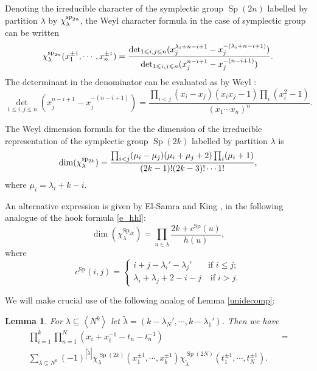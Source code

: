 \documentclass[11pt]{amsart}
\newcommand{\tmop}[1]{\ensuremath{\operatorname{#1}}}
\newtheorem{lemma}{Lemma}
\renewcommand{\sp}{{\rm sp}}
\begin{document}
Denoting the irreducible character of the symplectic group
$\tmop{Sp} ( 2 n )$ labelled by partition $\lambda$ by
$\chi_{\lambda}^{\sp_{2n}}$, the Weyl character formula
{\cite{weyl}} in the case of symplectic group can be written
\begin{equation}
  \label{charsp} \chi_{\lambda}^{\sp_{2n}}( x_1^{\pm 1}, \cdots,
  x_n^{\pm 1} ) = \frac{\det_{1 \leqslant i, j \leqslant n} ( x_j^{\lambda_i +
  n - i + 1} - x_j^{- ( \lambda_i + n - i + 1 )} )}{\det_{1 \leqslant i, j
  \leqslant n} ( x_j^{n - i + 1} - x_j^{- ( n - i + 1 )} )} .
\end{equation}
The determinant in the denominator can be evaluated as by Weyl
{\cite{weyl}}:
\begin{equation}
  \label{detsp} \det_{1 \leqslant i, j \leqslant n} ( x_j^{n - i + 1} - x_j^{-
  ( n - i + 1 )} ) = \frac{\prod_{i < j} ( x_i - x_j ) ( x_i x_j - 1 ) \prod_i
  ( x_i^2 - 1 )}{( x_1 \cdots x_n )^n} .
\end{equation}


The Weyl dimension formula for the the dimension of the
irreducible
  representation of the symplectic group $\tmop{Sp} ( 2 k )$ labelled by
  partition $\lambda$ is
  \[\dim(\chi_{\lambda}^{\sp_{2k}}) = \frac{\prod_{i < j} ( \mu_i - \mu_j
     ) ( \mu_i + \mu_j + 2 ) \prod_i ( \mu_i + 1 )}{( 2 k - 1 ) ! ( 2 k - 3 )
     ! \cdots 1!}, \]
  where $\mu_i = \lambda_i + k - i$.

  An alternative expression is given by El-Samra and King {\cite{EK}}, in the
  following analogue of the hook formula \eqref{e_hhl}:
  \begin{equation}
    \label{elsamra} \dim ( \chi_{\lambda}^{\tmop{Sp}_{2 k}} ) = \prod_{u \in
    \lambda} \frac{2 k + c^{\tmop{Sp}} ( u )}{h ( u )},
  \end{equation}
  where
  \[ c^{\tmop{Sp}} ( i, j ) = \left\{\begin{array}{ll}
       i + j - \lambda_i' - \lambda_j' & \text{if $i \leqslant j$;}\\
       \lambda_i + \lambda_j + 2 - i - j & \tmop{if} i > j.
     \end{array}\right. \]

We will make crucial use of the following analog of Lemma
\ref{unidecomp}:

\begin{lemma}\label{symplecticdecomposition}
  For $\lambda \subseteq
  \left\langle N^k
  \right\rangle$ let $\tilde{\lambda} = ( k - \lambda_N', \cdots, k- \lambda_1' )$.
   Then we have
  \begin{eqnarray}
    \prod_{i = 1}^k \prod_{n = 1}^N ( x_i + x_i^{- 1} - t_n - t_n^{- 1} ) &  &
    = \nonumber\\
    \sum_{\lambda \subseteq N^k} ( - 1 )^{| \tilde{\lambda} |}
    \chi_{\lambda}^{\tmop{Sp} ( 2 k )} ( x_1^{\pm 1}, \cdots, x_k^{\pm 1} )
    \chi_{\tilde{\lambda}}^{\tmop{Sp} ( 2 N )} ( t_1^{\pm 1}, \cdots, t_N^{\pm
    1} ) . &  &  \label{ecfspone}
  \end{eqnarray}
\end{lemma}
\end{document}

